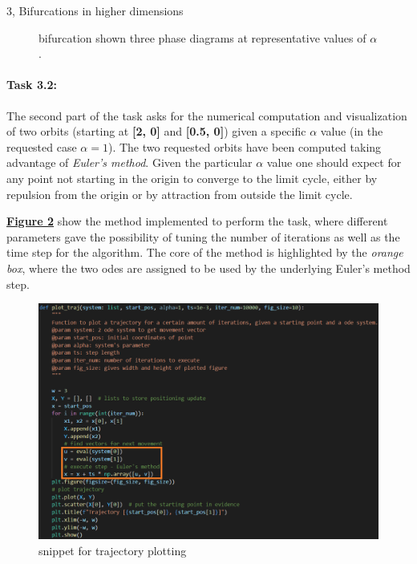 \documentclass[10pt,a4paper]{article}
\begin{document}
\begin{task}{3, Bifurcations in higher dimensions}
\begin{figure}[H]
    \hfill
    \caption{bifurcation shown three phase diagrams at representative values of $\alpha$.}
    \label{fig:andronov-hopf-bifurcation}
\end{figure}

\paragraph{Task 3.2:}
The second part of the task asks for the numerical computation and visualization of two orbits (starting at \textbf{[2, 0]} and \textbf{[0.5, 0]}) given a specific $\alpha$ value (in the requested case $\alpha=1$). The two requested orbits have been computed taking advantage of \textit{Euler's method}. Given the particular $\alpha$ value one should expect for any point not starting in the origin to converge to the limit cycle, either by repulsion from the origin or by attraction from outside the limit cycle.

\textbf{\hyperref[fig:plot-traj]{Figure \ref{fig:plot-traj}}} show the method implemented to perform the task, where different parameters gave the possibility of tuning the number of iterations as well as the time step for the algorithm. The core of the method is highlighted by the \textit{orange box}, where the two odes are assigned to be used by the underlying Euler's method step.
\begin{figure}[H]
    \centering
    \includegraphics[scale=0.5]{images/plot_traj.png}
    \caption{snippet for trajectory plotting}
    \label{fig:plot-traj}
\end{figure}


\end{task}
\end{document}
